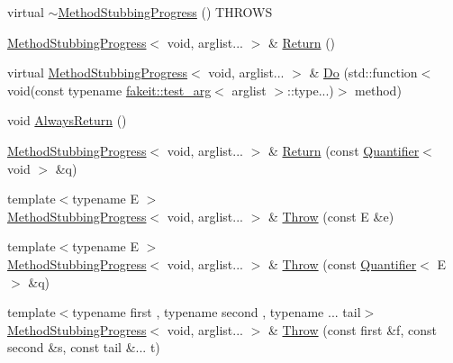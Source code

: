 \begin{DoxyCompactItemize}
\item 
virtual \mbox{\hyperlink{structfakeit_1_1MethodStubbingProgress_3_01void_00_01arglist_8_8_8_01_4_a13f7ed59a8bd8e214f54b4a2946556ac}{$\sim$\+Method\+Stubbing\+Progress}} () T\+H\+R\+O\+WS
\item 
\mbox{\hyperlink{structfakeit_1_1MethodStubbingProgress}{Method\+Stubbing\+Progress}}$<$ void, arglist... $>$ \& \mbox{\hyperlink{structfakeit_1_1MethodStubbingProgress_3_01void_00_01arglist_8_8_8_01_4_ada79edce54db3ffaa88985829f9b5558}{Return}} ()
\item 
virtual \mbox{\hyperlink{structfakeit_1_1MethodStubbingProgress}{Method\+Stubbing\+Progress}}$<$ void, arglist... $>$ \& \mbox{\hyperlink{structfakeit_1_1MethodStubbingProgress_3_01void_00_01arglist_8_8_8_01_4_ae41031c8833fad09c16cbbc89569918b}{Do}} (std\+::function$<$ void(const typename \mbox{\hyperlink{structfakeit_1_1test__arg}{fakeit\+::test\+\_\+arg}}$<$ arglist $>$\+::type...)$>$ method)
\item 
void \mbox{\hyperlink{structfakeit_1_1MethodStubbingProgress_3_01void_00_01arglist_8_8_8_01_4_a750cd97e361c308232871da7c336e53e}{Always\+Return}} ()
\item 
\mbox{\hyperlink{structfakeit_1_1MethodStubbingProgress}{Method\+Stubbing\+Progress}}$<$ void, arglist... $>$ \& \mbox{\hyperlink{structfakeit_1_1MethodStubbingProgress_3_01void_00_01arglist_8_8_8_01_4_afbc0d4429dddcbab63de1c88176ea0f1}{Return}} (const \mbox{\hyperlink{structfakeit_1_1Quantifier}{Quantifier}}$<$ void $>$ \&q)
\item 
{\footnotesize template$<$typename E $>$ }\\\mbox{\hyperlink{structfakeit_1_1MethodStubbingProgress}{Method\+Stubbing\+Progress}}$<$ void, arglist... $>$ \& \mbox{\hyperlink{structfakeit_1_1MethodStubbingProgress_3_01void_00_01arglist_8_8_8_01_4_a8b0d920dc6424eadd7dce7cb9df66814}{Throw}} (const E \&e)
\item 
{\footnotesize template$<$typename E $>$ }\\\mbox{\hyperlink{structfakeit_1_1MethodStubbingProgress}{Method\+Stubbing\+Progress}}$<$ void, arglist... $>$ \& \mbox{\hyperlink{structfakeit_1_1MethodStubbingProgress_3_01void_00_01arglist_8_8_8_01_4_a9eb6f25dd382ef939b775345205f42c1}{Throw}} (const \mbox{\hyperlink{structfakeit_1_1Quantifier}{Quantifier}}$<$ E $>$ \&q)
\item 
{\footnotesize template$<$typename first , typename second , typename ... tail$>$ }\\\mbox{\hyperlink{structfakeit_1_1MethodStubbingProgress}{Method\+Stubbing\+Progress}}$<$ void, arglist... $>$ \& \mbox{\hyperlink{structfakeit_1_1MethodStubbingProgress_3_01void_00_01arglist_8_8_8_01_4_a2db97b61a39cc6cecc379f6d51234c8a}{Throw}} (const first \&f, const second \&s, const tail \&... t)

\end{DoxyCompactItemize}
